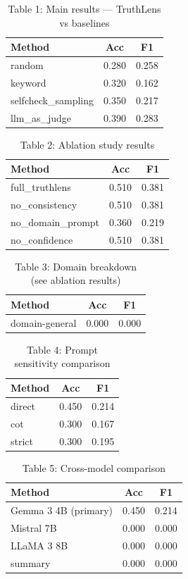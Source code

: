 \begin{table}[h]
\centering
\begin{tabular}{lcc}
Method & Acc & F1 \\ 
\hline
random & 0.280 & 0.258 \\
keyword & 0.320 & 0.162 \\
selfcheck_sampling & 0.350 & 0.217 \\
llm_as_judge & 0.390 & 0.283 \\
\end{tabular}
\caption{Table 1: Main results — TruthLens vs baselines}
\end{table}


\begin{table}[h]
\centering
\begin{tabular}{lcc}
Method & Acc & F1 \\ 
\hline
full_truthlens & 0.510 & 0.381 \\
no_consistency & 0.510 & 0.381 \\
no_domain_prompt & 0.360 & 0.219 \\
no_confidence & 0.510 & 0.381 \\
\end{tabular}
\caption{Table 2: Ablation study results}
\end{table}


\begin{table}[h]
\centering
\begin{tabular}{lcc}
Method & Acc & F1 \\ 
\hline
domain-general & 0.000 & 0.000 \\
\end{tabular}
\caption{Table 3: Domain breakdown (see ablation results)}
\end{table}


\begin{table}[h]
\centering
\begin{tabular}{lcc}
Method & Acc & F1 \\ 
\hline
direct & 0.450 & 0.214 \\
cot & 0.300 & 0.167 \\
strict & 0.300 & 0.195 \\
\end{tabular}
\caption{Table 4: Prompt sensitivity comparison}
\end{table}


\begin{table}[h]
\centering
\begin{tabular}{lcc}
Method & Acc & F1 \\ 
\hline
Gemma 3 4B (primary) & 0.450 & 0.214 \\
Mistral 7B & 0.000 & 0.000 \\
LLaMA 3 8B & 0.000 & 0.000 \\
summary & 0.000 & 0.000 \\
\end{tabular}
\caption{Table 5: Cross-model comparison}
\end{table}


